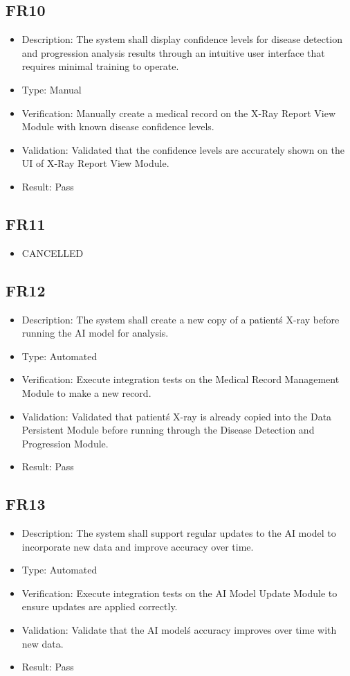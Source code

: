 \documentclass[12pt, titlepage]{article}
\begin{document}
\subsection{FR10}
\begin{itemize}  
  \item Description: The system shall display confidence levels for disease detection and progression analysis results through an intuitive user interface that requires minimal training to operate.
  \item Type: Manual
  \item Verification: Manually create a medical record on the X-Ray Report View Module with known disease confidence levels.
  \item Validation: Validated that the confidence levels are accurately shown on the UI of X-Ray Report View Module.
  \item Result: Pass
\end{itemize}

\subsection{FR11}
\begin{itemize}  
  \item CANCELLED
\end{itemize}

\subsection{FR12}
\begin{itemize}  
  \item Description: The system shall create a new copy of a patient\'s X-ray before running the AI model for analysis.
  \item Type: Automated
  \item Verification: Execute integration tests on the Medical Record Management Module to make a new record.
  \item Validation: Validated that patient\'s X-ray is already copied into the Data Persistent Module before running through the Disease Detection and Progression Module.
  \item Result: Pass
\end{itemize}

\subsection{FR13}
\begin{itemize}  
  \item Description: The system shall support regular updates to the AI model to incorporate new data and improve accuracy over time.
  \item Type: Automated
  \item Verification: Execute integration tests on the AI Model Update Module to ensure updates are applied correctly.
  \item Validation: Validate that the AI model\'s accuracy improves over time with new data.
  \item Result: Pass
\end{itemize}
\end{document}
